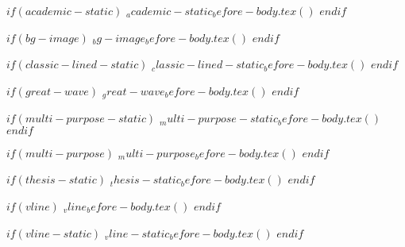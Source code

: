 $if(academic-static)$
$_academic-static_before-body.tex()$
$endif$

$if(bg-image)$
$_bg-image_before-body.tex()$
$endif$

$if(classic-lined-static)$
$_classic-lined-static_before-body.tex()$
$endif$

$if(great-wave)$
$_great-wave_before-body.tex()$
$endif$

$if(multi-purpose-static)$
$_multi-purpose-static_before-body.tex()$
$endif$

$if(multi-purpose)$
$_multi-purpose_before-body.tex()$
$endif$

$if(thesis-static)$
$_thesis-static_before-body.tex()$
$endif$

$if(vline)$
$_vline_before-body.tex()$
$endif$

$if(vline-static)$
$_vline-static_before-body.tex()$
$endif$
